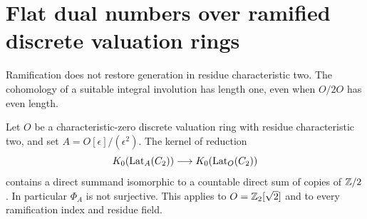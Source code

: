 \section{Flat dual numbers over ramified discrete valuation rings}
\label{sec:ramified-dual}

Ramification does not restore generation in residue characteristic two.
The cohomology of a suitable integral involution has length one, even
when $O/2O$ has even length.

\begin{theorem}\label{thm:ramified-dual}
Let $O$ be a characteristic-zero discrete valuation ring with residue
characteristic two, and set $A=O[\epsilon]/(\epsilon^2)$.
The kernel of reduction
\[
 K_0(\operatorname{Lat}_A(C_2))\longrightarrow K_0(\operatorname{Lat}_O(C_2))
\]
contains a direct summand isomorphic to a countable direct sum of copies
of $\mathbb Z/2$.  In particular $\Phi_A$ is not surjective.  This applies to
$O=\mathbb Z_2[\sqrt2]$ and to every ramification index and residue field.
\end{theorem}

